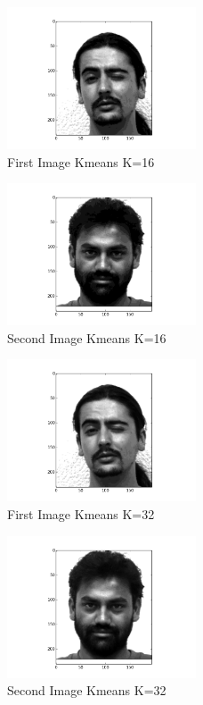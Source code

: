 \documentclass[conference]{IEEEtran}
\begin{document}
    \begin{figure}[htbp]
        \centerline{\includegraphics[width=0.5\textwidth]{kmeans16-1.png}}
        \caption{First Image Kmeans K=16}
    \end{figure}

    \begin{figure}[htbp]
        \centerline{\includegraphics[width=0.5\textwidth]{kmeans16-2.png}}
        \caption{Second Image Kmeans K=16}
    \end{figure}

    \begin{figure}[htbp]
        \centerline{\includegraphics[width=0.5\textwidth]{kmeans32-1.png}}
        \caption{First Image Kmeans K=32}
    \end{figure}

    \begin{figure}[htbp]
        \centerline{\includegraphics[width=0.5\textwidth]{kmeans32-2.png}}
        \caption{Second Image Kmeans K=32}
    \end{figure}
\end{document}
